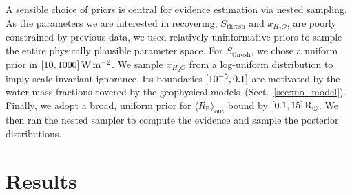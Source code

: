 \documentclass[modern]{aastex631}
\begin{document}
A sensible choice of priors is central for evidence estimation via nested sampling.
As the parameters we are interested in recovering, $S_\mathrm{thresh}$ and $x_{H_2O}$, are poorly constrained by previous data, we used relatively uninformative priors to sample the entire physically plausible parameter space.
For $S_\mathrm{thresh}$, we chose a uniform prior in $[10,1000]\, \SI{}{\watt\per\meter\squared}$.
We sample $x_{H_2O}$ from a log-uniform distribution to imply scale-invariant ignorance.
Its boundaries $[10^{-5}, 0.1]$ are motivated by the water mass fractions covered by the geophysical models~(Sect.~\ref{sec:mo_model}).
Finally, we adopt a broad, uniform prior for $\langle R_\mathrm{P}\rangle_\mathrm{out}$ bound by $[0.1, 15] \, \mathrm{R_\oplus}$.
We then ran the nested sampler to compute the evidence and sample the posterior distributions.



\section{Results}
\end{document}
